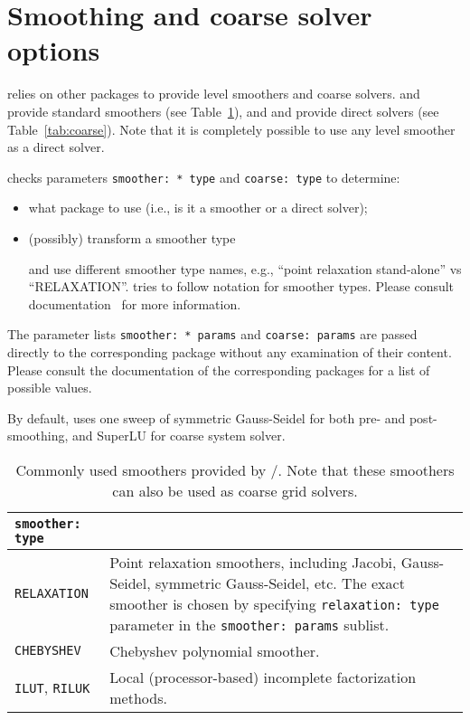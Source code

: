 

\section{Smoothing and coarse solver options}
\label{sec:options_smoothing}

\muelu{} relies on other \trilinos{} packages to provide level smoothers and
coarse solvers. \ifpack{} and \ifpacktwo{} provide standard smoothers (see
Table~\ref{tab:smoothers}), and \amesos{} and \amesostwo{} provide direct
solvers (see Table~\ref{tab:coarse}). Note that it is completely possible to use
any level smoother as a direct solver.

\muelu{} checks parameters \verb|smoother: * type| and \verb|coarse: type| to
determine:
\begin{itemize}
  \item what package to use (i.e., is it a smoother or a direct solver);
  \item (possibly) transform a smoother type

     \ifpack{} and \ifpacktwo{} use different smoother type names,
    e.g., ``point relaxation stand-alone'' vs ``RELAXATION''.  \muelu{} tries to follow
    \ifpacktwo{} notation for smoother types. Please consult \ifpacktwo{}
    documentation~\cite{Ifpack2} for more information.
\end{itemize}
The parameter lists \verb|smoother: * params| and \verb|coarse: params| are
passed directly to the corresponding package without any examination of their
content. Please consult the documentation of the corresponding packages for a list of
possible values.

By default, \muelu{} uses one sweep of symmetric Gauss-Seidel for both pre- and
post-smoothing, and SuperLU for coarse system solver.

\begin{table}[tbh]
  \begin{center}
    \begin{tabular}{p{4.0cm} p{10cm}}
      \toprule
      \texttt{smoother: type}           & \\
      \midrule
      \verb|RELAXATION|                 & Point relaxation smoothers, including
                                          Jacobi, Gauss-Seidel, symmetric Gauss-Seidel, etc. The exact
                                          smoother is chosen by specifying \texttt{relaxation: type} parameter in
                                          the \texttt{smoother: params} sublist. \\
      \verb|CHEBYSHEV|                  & Chebyshev polynomial smoother. \\
      \verb|ILUT|, \verb|RILUK|         & Local (processor-based) incomplete factorization methods. \\
      \bottomrule
    \end{tabular}
    \caption{Commonly used smoothers provided by \ifpack{}/\ifpacktwo{}. Note
    that these smoothers can also be used as coarse grid solvers.}
\label{tab:smoothers}
  \end{center}
\end{table}

